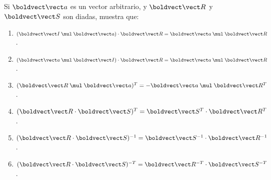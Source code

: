 \documentclass[../main.tex]{subfiles}
\begin{document}
\begin{problema}
	Si \(\vb{a}\) es un vector arbitrario, y \(\vb{R}\) y \(\vb{S}\) son diadas,
	muestra que:

	\begin{enumerate}
		\item \(\dotp{(\crossp{\vb{I}}{\vb{a}})}{\vb{R}} = \crossp{\vb{a}}{\vb{R}}\).
		\item \(\dotp{(\crossp{\vb{a}}{\vb{I}})}{\vb{R}} = \crossp{\vb{a}}{\vb{R}}\).
		\item \((\crossp{\vb{R}}{\vb{a}})^{T} = -\crossp{\vb{a}}{\vb{R}^{T}}\).
		\item \((\dotp{\vb{R}}{\vb{S}})^{T} = \dotp{\vb{S}^{T}}{\vb{R}^{T}}\).
		\item \((\dotp{\vb{R}}{\vb{S}})^{-1} = \dotp{\vb{S}^{-1}}{\vb{R}^{-1}}\).
		\item \((\dotp{\vb{R}}{\vb{S}})^{-T} = \dotp{\vb{R}^{-T}}{\vb{S}^{-T}}\).
	\end{enumerate}
\end{problema}
\end{document}
